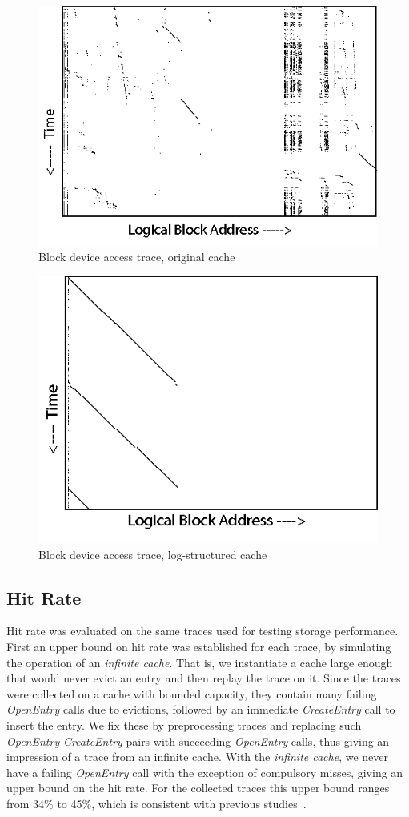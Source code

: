 \documentclass[letterpaper,twocolumn,10pt]{article}
\begin{document}
\begin{figure}[t]
\centering
\includegraphics[width=0.8\columnwidth]{graphs/disk.png}
\caption{Block device access trace, original cache}
\label{fig:blktrace:disk}
\end{figure}

\begin{figure}
\centering
\includegraphics[width=0.717\columnwidth]{graphs/flash.png}
\caption{Block device access trace, log-structured cache}
\label{fig:blktrace:flash}
\end{figure}

\subsection{Hit Rate}

Hit rate was evaluated on the same traces used for testing storage
performance. First an upper bound on hit rate was established for each trace, by
simulating the operation of an \emph{infinite cache}.  That is, we instantiate a
cache large enough that would never evict an entry and then replay the trace on
it.  Since the traces were collected on a cache with bounded capacity, they
contain many failing \emph{OpenEntry} calls due to evictions, followed by an
immediate \emph{CreateEntry} call to insert the entry.  We fix these by
preprocessing traces and replacing such \emph{OpenEntry}-\emph{CreateEntry}
pairs with succeeding \emph{OpenEntry} calls, thus giving an impression of a
trace from an infinite cache.  With the \emph{infinite cache}, we never have a
failing \emph{OpenEntry} call with the exception of compulsory misses, giving an
upper bound on the hit rate.  For the collected traces this upper bound ranges
from 34\% to 45\%, which is consistent with previous studies~\cite{souders12}.
\end{document}
